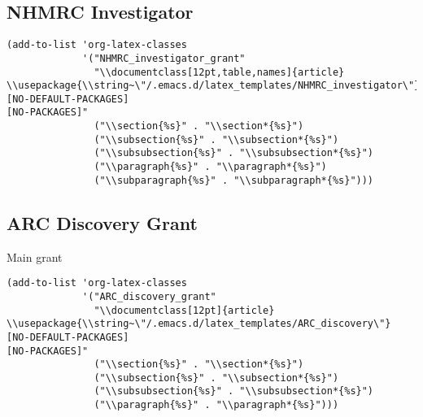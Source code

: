 \documentclass[12pt]{article}
\begin{document}
\subsection{NHMRC Investigator}
\label{sec:org9ed2a15}

\begin{verbatim}
(add-to-list 'org-latex-classes
             '("NHMRC_investigator_grant"
               "\\documentclass[12pt,table,names]{article}
\\usepackage{\\string~\"/.emacs.d/latex_templates/NHMRC_investigator\"}
[NO-DEFAULT-PACKAGES]
[NO-PACKAGES]"
               ("\\section{%s}" . "\\section*{%s}")
               ("\\subsection{%s}" . "\\subsection*{%s}")
               ("\\subsubsection{%s}" . "\\subsubsection*{%s}")
               ("\\paragraph{%s}" . "\\paragraph*{%s}")
               ("\\subparagraph{%s}" . "\\subparagraph*{%s}")))
\end{verbatim}

\subsection{ARC Discovery Grant}
\label{sec:orga3563b7}

Main grant
\begin{verbatim}
(add-to-list 'org-latex-classes
             '("ARC_discovery_grant"
               "\\documentclass[12pt]{article}
\\usepackage{\\string~\"/.emacs.d/latex_templates/ARC_discovery\"}
[NO-DEFAULT-PACKAGES]
[NO-PACKAGES]"
               ("\\section{%s}" . "\\section*{%s}")
               ("\\subsection{%s}" . "\\subsection*{%s}")
               ("\\subsubsection{%s}" . "\\subsubsection*{%s}")
               ("\\paragraph{%s}" . "\\paragraph*{%s}")))
\end{verbatim}
\end{document}
